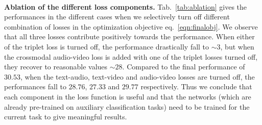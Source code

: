 \vspace{0.5em} \\
\textbf{Ablation of the different loss components.} Tab.~\ref{tab:ablation} gives the performances in the different cases when we selectively turn off different combination of losses in the optimization objective eq.~\ref{eqn:finalobj}. We observe that all three losses contribute positively towards the performance. When either of the triplet loss is turned off, the performance drastically fall to $\sim3$, but when the crossmodal audio-video loss is added with one of the triplet losses turned off, they recover to reasonable values $\sim28$. Compared to the final performance of $30.53$, when the text-audio, text-video and audio-video losses are turned off, the performances fall to $28.76$, $27.33$ and $29.77$ respectively. Thus we conclude that each component in the loss function is useful and that the networks (which are already pre-trained on auxiliary classification tasks) need to be trained for the current task to give meaningful results.

 
 
